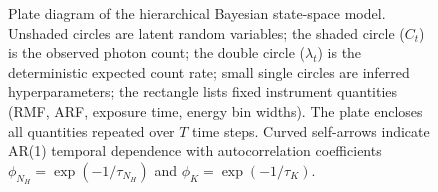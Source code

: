 \documentclass{aa}
\begin{document}
\begin{figure}[htbp]
\caption{Plate diagram of the hierarchical Bayesian state-space model.
Unshaded circles are latent random variables; the shaded circle
($C_t$) is the observed photon count; the double circle ($\lambda_t$)
is the deterministic expected count rate; small single circles are
inferred hyperparameters; the rectangle lists fixed instrument
quantities (RMF, ARF, exposure time, energy bin widths). The plate
encloses all quantities repeated over $T$ time steps. Curved
self-arrows indicate AR(1) temporal dependence with autocorrelation
coefficients $\phi_{N_H} = \exp(-1/\tau_{N_H})$ and
$\phi_K = \exp(-1/\tau_K)$.}
\label{fig:plate_diagram}
\end{figure}
\end{document}
